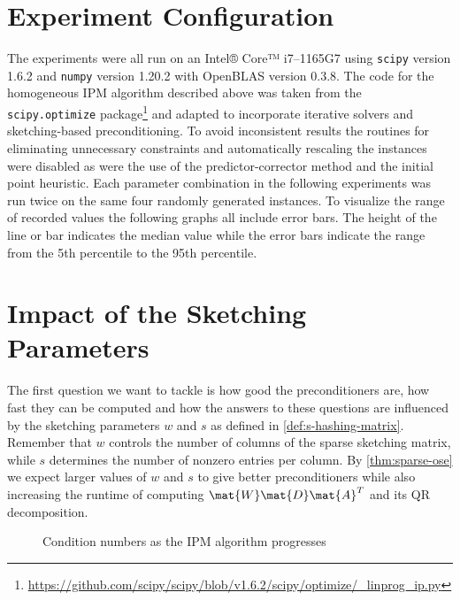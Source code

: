 \section{Experiment Configuration}\label{sec:experiment-configuration}

The experiments were all run on an Intel® Core™ i7--1165G7 using \texttt{scipy} version 1.6.2 and \texttt{numpy} version 1.20.2 with OpenBLAS version 0.3.8.
The code for the homogeneous IPM algorithm described above was taken from the \texttt{scipy.optimize} package\footnote{\url{https://github.com/scipy/scipy/blob/v1.6.2/scipy/optimize/_linprog_ip.py}} and adapted to incorporate iterative solvers and sketching-based preconditioning.
To avoid inconsistent results the routines for eliminating unnecessary constraints and automatically rescaling the instances were disabled as were the use of the predictor-corrector method and the initial point heuristic.
Each parameter combination in the following experiments was run twice on the same four randomly generated instances.
To visualize the range of recorded values the following graphs all include error bars.
The height of the line or bar indicates the median value while the error bars indicate the range from the 5th percentile to the 95th percentile.

\section{Impact of the Sketching Parameters}\label{sec:experiment-sketching-parameters}

The first question we want to tackle is how good the preconditioners are, how fast they can be computed and how the answers to these questions are influenced by the sketching parameters \(w\) and \(s\) as defined in \cref{def:s-hashing-matrix}.
Remember that \(w\) controls the number of columns of the sparse sketching matrix, while \(s\) determines the number of nonzero entries per column.
By \cref{thm:sparse-ose} we expect larger values of \(w\) and \(s\) to give better preconditioners while also increasing the runtime of computing \(\mat{W}\mat{D}\mat{A}^T\) and its QR decomposition.

\begin{figure}[tbp]
  \centering%
  \caption{Condition numbers as the IPM algorithm progresses}%
  \label{fig:condition_number_history}
\end{figure}

